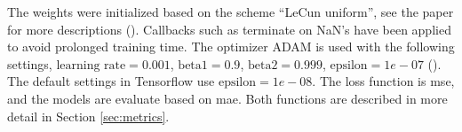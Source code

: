 The weights were initialized based on the scheme ``LeCun uniform'', see the paper for more descriptions (\cite{Lecun98efficientbackprop}). Callbacks such as %
terminate on NaN's have been applied to avoid prolonged training time. The optimizer ADAM is used with the following settings, $\text{learning rate}=0.001$, $\text{beta1}=0.9$, $\text{beta2}=0.999$, $\text{epsilon}=1e-07$ (\cite{Kingma2015Adam:Optimization}). The default settings in Tensorflow use $\text{epsilon}=1e-08$. The loss function is \acrfull{mse}, and the models are evaluate based on \acrfull{mae}.
Both functions are described in more detail in Section \ref{sec:metrics}. %


